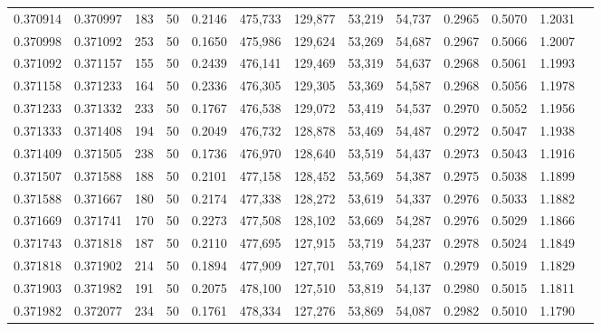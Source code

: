 \begin{tabular}{rrrrrrrrrrrrr}
0.370914 & 0.370997 &   183 &  50 &                                     0.2146 & 475,733 & 129,877 &  53,219 &  54,737 & 0.2965 & 0.5070 & 1.2031 \\
0.370998 & 0.371092 &   253 &  50 &                                     0.1650 & 475,986 & 129,624 &  53,269 &  54,687 & 0.2967 & 0.5066 & 1.2007 \\
0.371092 & 0.371157 &   155 &  50 &                                     0.2439 & 476,141 & 129,469 &  53,319 &  54,637 & 0.2968 & 0.5061 & 1.1993 \\
0.371158 & 0.371233 &   164 &  50 &                                     0.2336 & 476,305 & 129,305 &  53,369 &  54,587 & 0.2968 & 0.5056 & 1.1978 \\
0.371233 & 0.371332 &   233 &  50 &                                     0.1767 & 476,538 & 129,072 &  53,419 &  54,537 & 0.2970 & 0.5052 & 1.1956 \\
0.371333 & 0.371408 &   194 &  50 &                                     0.2049 & 476,732 & 128,878 &  53,469 &  54,487 & 0.2972 & 0.5047 & 1.1938 \\
0.371409 & 0.371505 &   238 &  50 &                                     0.1736 & 476,970 & 128,640 &  53,519 &  54,437 & 0.2973 & 0.5043 & 1.1916 \\
0.371507 & 0.371588 &   188 &  50 &                                     0.2101 & 477,158 & 128,452 &  53,569 &  54,387 & 0.2975 & 0.5038 & 1.1899 \\
0.371588 & 0.371667 &   180 &  50 &                                     0.2174 & 477,338 & 128,272 &  53,619 &  54,337 & 0.2976 & 0.5033 & 1.1882 \\
0.371669 & 0.371741 &   170 &  50 &                                     0.2273 & 477,508 & 128,102 &  53,669 &  54,287 & 0.2976 & 0.5029 & 1.1866 \\
0.371743 & 0.371818 &   187 &  50 &                                     0.2110 & 477,695 & 127,915 &  53,719 &  54,237 & 0.2978 & 0.5024 & 1.1849 \\
0.371818 & 0.371902 &   214 &  50 &                                     0.1894 & 477,909 & 127,701 &  53,769 &  54,187 & 0.2979 & 0.5019 & 1.1829 \\
0.371903 & 0.371982 &   191 &  50 &                                     0.2075 & 478,100 & 127,510 &  53,819 &  54,137 & 0.2980 & 0.5015 & 1.1811 \\
0.371982 & 0.372077 &   234 &  50 &                                     0.1761 & 478,334 & 127,276 &  53,869 &  54,087 & 0.2982 & 0.5010 & 1.1790 \\

\end{tabular}
